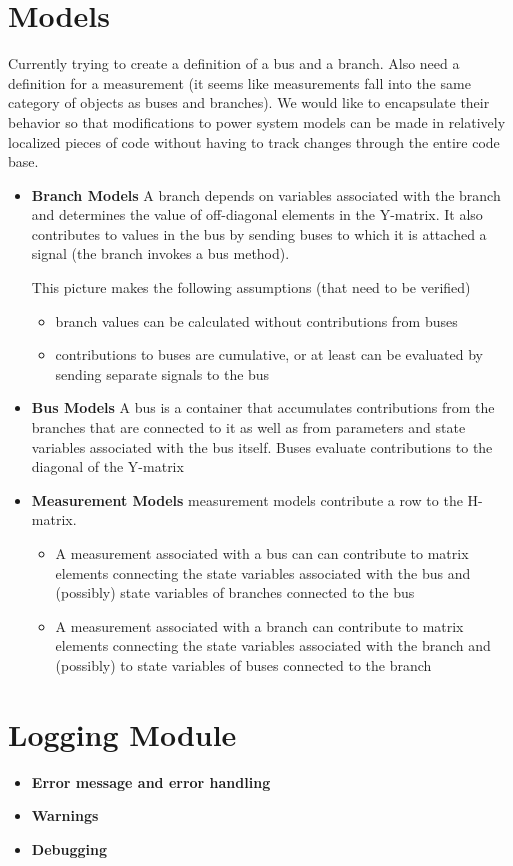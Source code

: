 \documentclass[12pt]{article}
\begin{document}
\section{Models}
Currently trying to create a definition of a bus and a branch. Also need a
definition for a measurement (it seems like measurements fall into the same
category of objects as buses and branches). We would like to encapsulate their
behavior so that modifications to power system models can be made in relatively
localized pieces of code without having to track changes through the entire code
base.
\begin{itemize}
\item{\bf Branch Models} A branch depends on variables associated with the
branch and determines the value of off-diagonal elements in the Y-matrix. It
also contributes to values in the bus by sending buses to which it is attached a
signal (the branch invokes a bus method).

This picture makes the following assumptions (that need to be verified)
\begin{itemize}
\item branch values can be calculated without contributions from buses
\item contributions to buses are cumulative, or at least can be evaluated by
sending separate signals to the bus
\end{itemize}
\item{\bf Bus Models} A bus is a container that accumulates contributions from
the branches that are connected to it as well as from parameters and state
variables associated with the bus itself. Buses evaluate contributions to the
diagonal of the Y-matrix
\item{\bf Measurement Models} measurement models contribute a row to the
H-matrix.
\begin{itemize}
\item A measurement associated with a bus can can contribute to matrix
elements connecting the state variables associated with the bus and (possibly)
state variables of branches connected to the bus
\item A measurement associated with a branch can contribute to matrix elements
connecting the state variables associated with the branch and (possibly) to
state variables of buses connected to the branch
\end{itemize}
\end{itemize}

\section{Logging Module}
\begin{itemize}
\item{\bf Error message and error handling}
\item{\bf Warnings}
\item{\bf Debugging}
\end{itemize}
\end{document}
